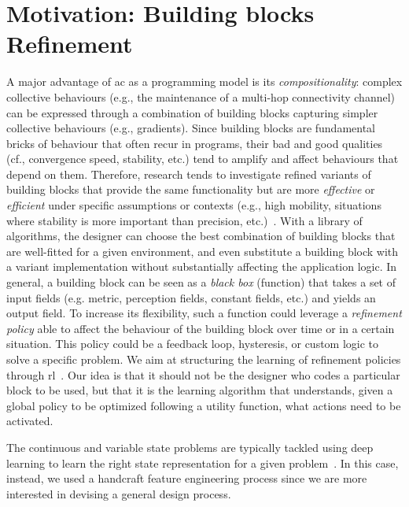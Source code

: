 \section{Motivation: Building blocks Refinement}\label{coordination2022:s:learning-gradient}
A major advantage of \ac{ac} as a programming model is its \emph{compositionality}: complex collective behaviours (e.g., the maintenance of a multi-hop connectivity channel) can be expressed through a combination of building blocks capturing simpler collective behaviours (e.g., gradients).
%
Since building blocks are fundamental bricks of behaviour that often recur in programs, 
 their bad and good qualities (cf., convergence speed, stability, etc.) tend to amplify and affect behaviours that depend on them.
%
Therefore, research tends to investigate refined variants of building blocks that provide the same functionality but are more \emph{effective} or \emph{efficient} under specific assumptions or contexts (e.g., high mobility, situations where stability is more important than precision, etc.)~\cite{DBLP:conf/saso/AudritoCDV17,DBLP:journals/cee/AudritoCDPV21}.
%
With a library of algorithms, 
 the designer can choose the best combination of building blocks that are well-fitted for a given environment, 
 and even substitute a building block with a variant implementation without substantially affecting the application logic.
%
In general, a building block can be seen as a \emph{black box} (function) that takes a set of input fields (e.g. metric, perception fields, constant fields, etc.) and yields an output field. 
%
To increase its flexibility, 
 such a function could leverage a \emph{refinement policy} able to affect the behaviour of the building block over time or in a certain situation. 
%
This policy could be a feedback loop, hysteresis, or custom logic to solve a specific problem.
%
We aim at structuring the learning of refinement policies through \ac{rl}~\cite{DBLP:conf/acsos/Aguzzi21}.
%
Our idea is that it should not be the designer who codes a particular block to be used, 
 but that it is the learning algorithm that understands, given a global policy to be optimized following a utility function, 
 what actions need to be activated.



The continuous and variable state problems are typically tackled using deep learning to learn the right state representation for a given problem~\cite{DBLP:journals/corr/abs-1806-08894}. %
%
In this case, instead, we used a handcraft feature engineering process since we are more interested in devising a general design process.

